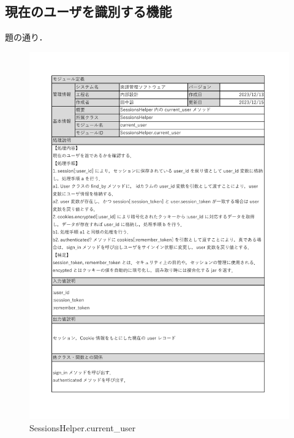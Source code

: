 \subsection*{現在のユーザを識別する機能}
題の通り．
\begin{figure}[H]
    \centering
    \includegraphics[scale=0.5]{img/Helper/current_user.pdf}
    \caption{SessionsHelper.current\_user}
\end{figure}
\clearpage

